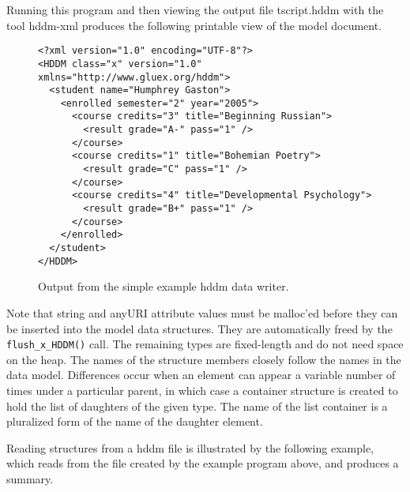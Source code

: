 \documentclass{revtex4}
\begin{document}
Running this program and then viewing the output file tscript.hddm with the tool
hddm-xml produces the following printable view of the model document.

\begin{figure}
\begin{minipage}{12cm}
\begin{verbatim}
<?xml version="1.0" encoding="UTF-8"?>
<HDDM class="x" version="1.0" xmlns="http://www.gluex.org/hddm">
  <student name="Humphrey Gaston">
    <enrolled semester="2" year="2005">
      <course credits="3" title="Beginning Russian">
        <result grade="A-" pass="1" />
      </course>
      <course credits="1" title="Bohemian Poetry">
        <result grade="C" pass="1" />
      </course>
      <course credits="4" title="Developmental Psychology">
        <result grade="B+" pass="1" />
      </course>
    </enrolled>
  </student>
</HDDM>
\end{verbatim}
\end{minipage}
\caption{\label{output_ex1}
Output from the simple example hddm data writer.
}
\end{figure}

Note that string and anyURI attribute values must be malloc'ed before they 
can be inserted into the model data structures. They are automatically freed by
the \texttt{flush\_x\_HDDM()} call. The remaining types are fixed-length and do
not need space on the heap.  The names of the structure members closely follow 
the names in the data model.  Differences occur when an element can appear a
variable number of times under a particular parent, in which case a container 
structure is created to hold the list of daughters of the given type.  The name
of the list container is a pluralized form of the name of the daughter element.

Reading structures from a hddm file is illustrated by the following example,
which reads from the file created by the example program above, and produces a summary.
\end{document}
